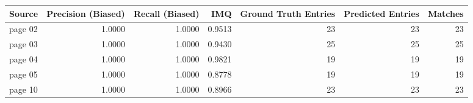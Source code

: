 \begin{tabular}{lrrrrrr}
\toprule
Source & Precision (Biased) & Recall (Biased) & IMQ & Ground Truth Entries & Predicted Entries & Matches \\
\midrule
page 02 & 1.0000 & 1.0000 & 0.9513 & 23 & 23 & 23 \\
page 03 & 1.0000 & 1.0000 & 0.9430 & 25 & 25 & 25 \\
page 04 & 1.0000 & 1.0000 & 0.9821 & 19 & 19 & 19 \\
page 05 & 1.0000 & 1.0000 & 0.8778 & 19 & 19 & 19 \\
page 10 & 1.0000 & 1.0000 & 0.8966 & 23 & 23 & 23 \\
\bottomrule
\end{tabular}
